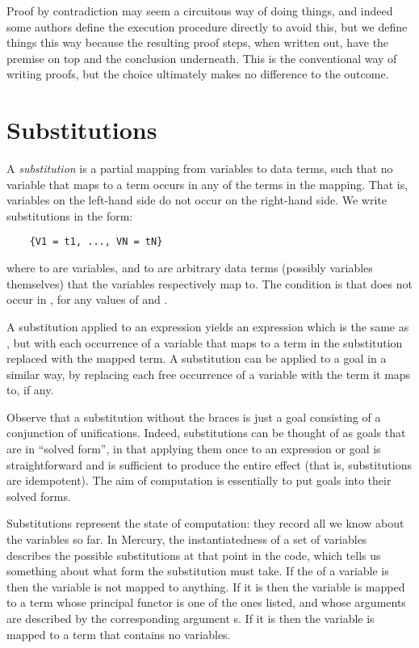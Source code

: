 Proof by contradiction
may seem a circuitous way of doing things,
and indeed some authors
define the execution procedure directly to avoid this,
but we define things this way
because the resulting proof steps, when written out,
have the premise on top and the conclusion underneath.
This is the conventional way of writing proofs,
but the choice ultimately makes no difference to the outcome.


\section{Substitutions}
\label{sec:substitutions}

A \emph{substitution\label{gi:substitution}}
is a partial mapping from variables to data terms,
such that no variable that maps to a term
occurs in any of the terms in the mapping.
That is, variables on the left-hand side
do not occur on the right-hand side.
We write substitutions in the form:
\begin{verbatim}
    {V1 = t1, ..., VN = tN}
\end{verbatim}
where  to  are variables,
and  to  are arbitrary data terms
(possibly variables themselves)
that the variables respectively map to.
The condition is that  does not occur in ,
for any values of  and .

A substitution applied to an expression 
yields an expression which is the same as ,
but with each occurrence of a variable
that maps to a term in the substitution
replaced with the mapped term.
A substitution can be applied to a goal in a similar way,
by replacing each free occurrence of a variable
with the term it maps to, if any.

Observe that a substitution without the braces
is just a goal consisting of a conjunction of unifications.
Indeed, substitutions can be thought of as
goals that are in ``solved form''\label{gi:solved-form},
in that applying them once to an expression or goal
is straightforward
and is sufficient to produce the entire effect
(that is, substitutions are idempotent).
The aim of computation is essentially to put goals into
their solved forms.

Substitutions represent the state of computation:
they record all we know about the variables so far.
In Mercury,
the instantiatedness of a set of variables
describes the possible substitutions at that point in the code,
which tells us something about
what form the substitution must take.
If the  of a variable is 
then the variable is not mapped to anything.
If it is  then the variable is mapped to
a term whose principal functor is one of the ones listed,
and whose arguments are described by
the corresponding argument s.
If it is  then the variable is mapped to
a term that contains no variables.

